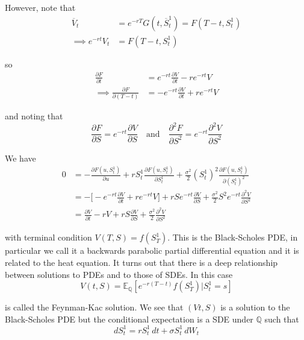 \documentclass[12pt]{article}
\begin{document}
However, note that
\begin{align*}
	\overline{V}_t &= e^{-rT}G(t, \overline{S}^1_t) = F(T - t,S^1_t) \\
	\implies e^{-rt}V_t &= F(T - t,S^1_t)
\end{align*}

so
\begin{align*}
	\frac{\partial F}{\partial t} &= e^{-rt}\frac{\partial V}{\partial t} - re^{-rt}V \\
	\implies \frac{\partial F}{\partial (T - t)} &= -e^{-rt}\frac{\partial V}{\partial t} + re^{-rt}V
\end{align*}

and noting that
\begin{equation*}
	\frac{\partial F}{\partial S} = e^{-rt}\frac{\partial V}{\partial S} \quad \text{and} \quad \frac{\partial^2 F}{\partial S^2} = e^{-rt}\frac{\partial^2 V}{\partial S^2}
\end{equation*}

We have
\begin{align*}
	0 &= -\frac{\partial F(u, S^1_t)}{\partial u} + rS^1_t\frac{\partial F(u, S^1_t)}{\partial S^1_t} + \frac{\sigma^2}{2}(S^1_t)^2 \frac{\partial F(u, S^1_t)}{\partial (S^1_t)^2} \\
	&= -\bigg[-e^{-rt}\frac{\partial V}{\partial t} + re^{-rt}V\bigg] + rSe^{-rt}\frac{\partial V}{\partial S} + \frac{\sigma^2}{2}S^2e^{-rt}\frac{\partial^2 V}{\partial S^2} \\
	&= \frac{\partial V}{\partial t} - rV + rS\frac{\partial V}{\partial S} + \frac{\sigma^2}{2}\frac{\partial^2 V}{\partial S^2}
\end{align*}

with terminal condition $V(T,S) = f(S^1_T)$. This is the Black-Scholes PDE, in particular we call it a backwards parabolic partial differential equation and it is related to the heat equation. It turns out that there is a deep relationship between solutions to PDEs and to those of SDEs. In this case
\begin{equation*}
	V(t,S) = \mathbb E_{\mathbb Q}[e^{-r(T - t)}f(S^1_T)|S^1_t = s]
\end{equation*}

is called the Feynman-Kac solution. We see that $(Vt,S)$ is a solution to the Black-Scholes PDE but the conditional expectation is a SDE under $\mathbb Q$ such that
\begin{equation*}
	dS^1_t = rS^1_t\,dt + \sigma S^1_t\,dW_t
\end{equation*}
\end{document}
